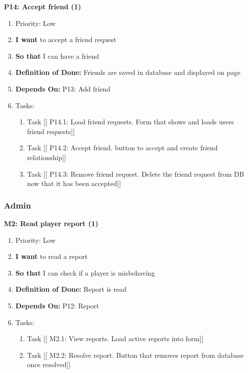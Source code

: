 \vspace{2em}

\textbf{P14: Accept friend (1)}
\begin{enumerate}
    \item Priority: Low
    \item \textbf{I want} to accept a friend request
    \item \textbf{So that} I can have a friend
    \item \textbf{Definition of Done:} Friends are saved in database and displayed on page
    \item \textbf{Depends On:} P13: Add friend
    \item Tasks:
    \begin{enumerate}
        \item Task [[ P14.1: Load friend requests. Form that shows and loads users friend requests]]
        \item Task [[ P14.2: Accept friend. button to accept and create friend relationship]]
        \item Task [[ P14.3: Remove friend request. Delete the friend request from DB now that it has been accepted]]
    \end{enumerate}
\end{enumerate}

\subsubsection{Admin}

\textbf{M2: Read player report (1)}
\begin{enumerate}
    \item Priority: Low
    \item \textbf{I want} to read a report
    \item \textbf{So that} I can check if a player is misbehaving
    \item \textbf{Definition of Done:} Report is read
    \item \textbf{Depends On:} P12: Report
    \item Tasks:
    \begin{enumerate}
        \item Task [[ M2.1: View reports. Load active reports into form]]
        \item Task [[ M2.2: Resolve report. Button that removes report from database once resolved]]
    \end{enumerate}
\end{enumerate}


